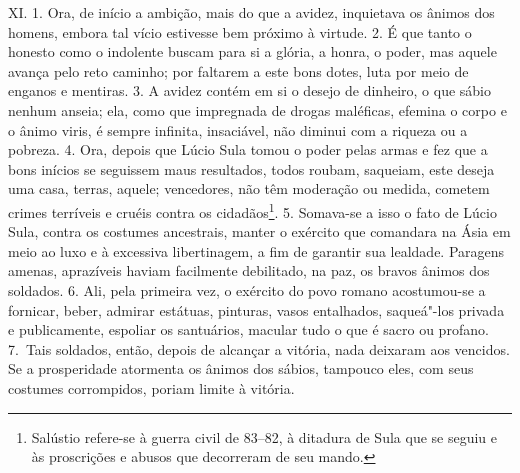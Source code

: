 XI. 1. Ora, de início a ambição, mais do que a avidez, inquietava os ânimos dos
homens, embora tal vício estivesse bem próximo à virtude. 2. É que tanto o
honesto como o indolente buscam para si a glória, a honra, o poder, mas aquele
avança pelo reto caminho; por faltarem a este bons dotes, luta por meio de
enganos e mentiras. 3. A avidez contém em si o desejo de dinheiro, o que sábio
nenhum anseia; ela, como que impregnada de drogas maléficas, efemina o corpo e
o ânimo viris, é sempre infinita, insaciável, não diminui com a riqueza ou a
pobreza. 4. Ora, depois que Lúcio Sula tomou o poder pelas armas e fez que a
bons inícios se seguissem maus resultados, todos roubam, saqueiam, este deseja
uma casa, terras, aquele; vencedores, não têm moderação ou medida, cometem
crimes terríveis e cruéis contra os cidadãos\footnote{Salústio refere-se à
guerra civil de 83--82, à ditadura de Sula que se seguiu e às proscrições e
abusos que decorreram de seu mando.}. 5. Somava-se a isso o fato de Lúcio Sula,
contra os costumes ancestrais, manter o exército que comandara na Ásia em meio
ao luxo e à excessiva libertinagem, a fim de garantir sua lealdade. Paragens
amenas, aprazíveis haviam facilmente debilitado, na paz, os bravos ânimos dos
soldados. 6. Ali, pela primeira vez, o exército do povo romano acostumou-se a
fornicar, beber, admirar estátuas, pinturas, vasos entalhados, saqueá"-los
privada e publicamente, espoliar os santuários, macular tudo o que é sacro ou
profano. 7.~Tais soldados, então, depois de alcançar a vitória, nada deixaram
aos vencidos. Se a prosperidade atormenta os ânimos dos sábios, tampouco eles,
com seus costumes corrompidos, poriam limite à vitória.

